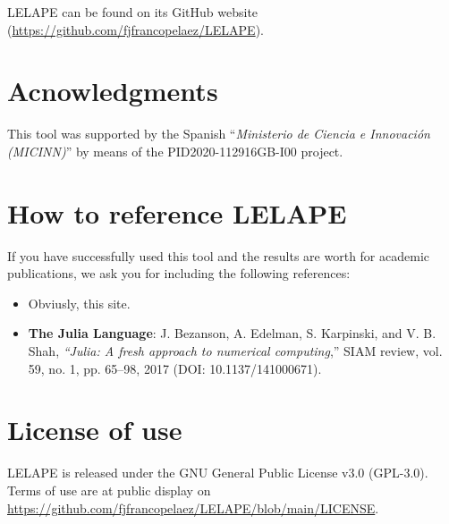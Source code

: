 LELAPE can be found on its GitHub website (\href{https://github.com/fjfrancopelaez/LELAPE}{https://github.com/fjfrancopelaez/LELAPE}).

\section{Acnowledgments}
%
This tool was supported by the Spanish ``\textit{Ministerio de Ciencia e Innovación (MICINN)}'' by means of the PID2020-112916GB-I00 project.
\section{How to reference LELAPE}
%
If you have successfully used this tool and the results are worth for academic publications, we ask you for including the following references:
%
\begin{itemize}
	\item Obviusly, this site.
	\item \textbf{The Julia Language}: J. Bezanson, A. Edelman, S. Karpinski, and V. B. Shah, \textit{“Julia: A fresh approach to numerical computing},” SIAM review, vol. 59, no. 1, pp. 65–98, 2017 (DOI: 10.1137/141000671).
\end{itemize}
%
\section{License of use}
%
LELAPE is released under the GNU General Public License v3.0 (GPL-3.0). Terms of use are at public display on \href{https://github.com/fjfrancopelaez/LELAPE/blob/main/LICENSE}{https://github.com/fjfrancopelaez/LELAPE/blob/main/LICENSE}. 


